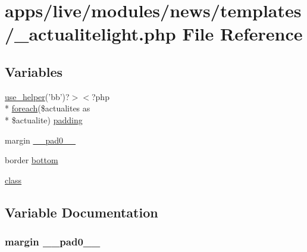 \hypertarget{live_2modules_2news_2templates_2__actualitelight_8php}{\section{apps/live/modules/news/templates/\-\_\-actualitelight.php File Reference}
\label{live_2modules_2news_2templates_2__actualitelight_8php}
}
\subsection*{Variables}
\begin{DoxyCompactItemize}
\item 
\hyperlink{presse_2modules_2page_2templates_2view_success_8php_ad20740d877696f45a78b0497ff807965}{use\-\_\-helper}('bb')?$>$$<$?php \\*
\hyperlink{presse_2modules_2news_2templates_2index_success_8php_abc56db52b2e9a59bcd5c9e45ac5cb332}{foreach}(\$actualites as \\*
\$actualite) \hyperlink{live_2modules_2news_2templates_2__actualitelight_8php_a8b88ec114037db665a2b86d0456baf8e}{padding}
\item 
margin \hyperlink{live_2modules_2news_2templates_2__actualitelight_8php_a03346576b6acd300639bd7e7018e9f58}{\-\_\-\-\_\-pad0\-\_\-\-\_\-}
\item 
border \hyperlink{live_2modules_2news_2templates_2__actualitelight_8php_a41d00934c30e27f51d16f653af5a3e03}{bottom}
\item 
\hyperlink{live_2modules_2news_2templates_2__actualitelight_8php_a185c73c6507391d1eb38c776b68ce96d}{class}
\end{DoxyCompactItemize}


\subsection{Variable Documentation}
\hypertarget{live_2modules_2news_2templates_2__actualitelight_8php_a03346576b6acd300639bd7e7018e9f58}{
\subsubsection[{\-\_\-\-\_\-pad0\-\_\-\-\_\-}]{\setlength{\rightskip}{0pt plus 5cm}margin \-\_\-\-\_\-pad0\-\_\-\-\_\-}}\label{live_2modules_2news_2templates_2__actualitelight_8php_a03346576b6acd300639bd7e7018e9f58}


